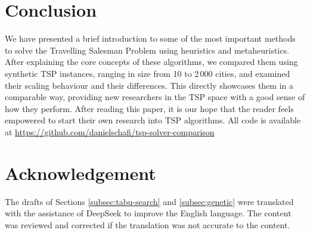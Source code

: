 \section{Conclusion}

We have presented a brief introduction to some of the most important methods to solve the Travelling Salesman Problem using heuristics and metaheuristics.
After explaining the core concepts of these algorithms, we compared them using synthetic TSP instances, ranging in size from 10 to 2\,000 cities, and examined their scaling behaviour and their differences.
This directly showcases them in a comparable way, providing new researchers in the TSP space with a good sense of how they perform.
After reading this paper, it is our hope that the reader feels empowered to start their own research into TSP algorithms.
All code is available at \url{https://github.com/danielschafi/tsp-solver-comparison}


\section{Acknowledgement}
The drafts of Sections \ref{subsec:tabu-search} and \ref{subsec:genetic} were translated
with the assistance of DeepSeek \cite{DeepSeekShenDuQiuSuo} to improve the English language.
The content was reviewed and corrected if the translation was not accurate to the content.
